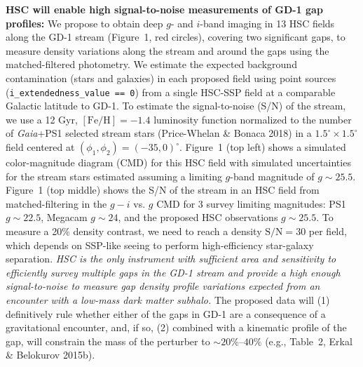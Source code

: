 \documentclass[11pt]{article}
\begin{document}
\textbf{HSC will enable high signal-to-noise measurements of GD-1 gap profiles:}
We propose to obtain deep $g$- and $i$-band imaging in 13 HSC fields along the GD-1 stream (Figure~1, red circles), covering two significant gaps, to measure density variations along the stream and around the gaps using the matched-filtered photometry.
We estimate the expected background contamination (stars and galaxies) in each proposed field using point sources (\texttt{i\_extendedness\_value == 0}) from a single HSC-SSP field at a comparable Galactic latitude to GD-1.
To estimate the signal-to-noise (S/N) of the stream, we use a 12 Gyr, $[\textrm{Fe}/\textrm{H}] = -1.4$ luminosity function normalized to the number of \textit{Gaia}+PS1 selected stream stars (Price-Whelan \& Bonaca 2018) in a $1.5^\circ \times 1.5^\circ$ field centered at $(\phi_1, \phi_2) = (-35, 0)^\circ$.
Figure~1 (top left) shows a simulated color-magnitude diagram (CMD) for this HSC field with simulated uncertainties for the stream stars estimated assuming a limiting $g$-band magnitude of $g \sim 25.5$.
Figure~1 (top middle) shows the S/N of the stream in an HSC field from matched-filtering in the $g-i$ vs. $g$ CMD for 3 survey limiting magnitudes: PS1 $g \sim 22.5$, Megacam $g \sim 24$, and the proposed HSC observations $g \sim 25.5$.
To measure a 20\% density contrast, we need to reach a density $\textrm{S}/\textrm{N} = 30$ per field, which depends on SSP-like seeing to perform high-efficiency star-galaxy separation.
\emph{HSC is the only instrument with sufficient area and sensitivity to efficiently survey multiple gaps in the GD-1 stream and provide a high enough signal-to-noise to measure gap density profile variations expected from an encounter with a low-mass dark matter subhalo.}
The proposed data will (1) definitively rule whether either of the gaps in GD-1 are a consequence of a gravitational encounter, and, if so, (2) combined with a kinematic profile of the gap, will constrain the mass of the perturber to $\sim 20\%$--$40\%$ (e.g., Table~2, Erkal \& Belokurov 2015b).
\end{document}
